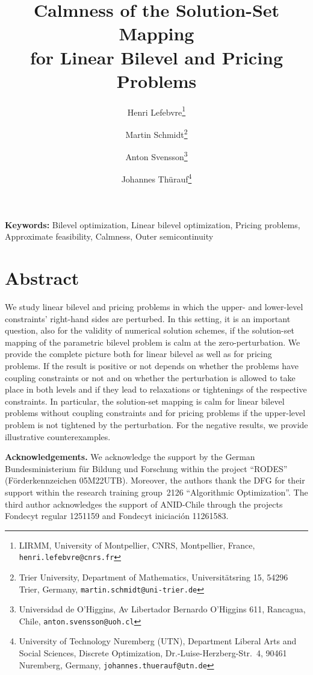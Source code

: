 \documentclass[11pt]{article}
\title{\bfseries Calmness of the Solution-Set Mapping\\for Linear
  Bilevel and Pricing Problems}
\author{
  Henri Lefebvre\thanks{LIRMM, University of Montpellier, CNRS,
    Montpellier, France,
    \texttt{henri.lefebvre@cnrs.fr}}
  \and
  Martin Schmidt\thanks{Trier University,
    Department of Mathematics,
    Universitätsring 15,
    54296 Trier,
    Germany,
    \texttt{martin.schmidt@uni-trier.de}}
  \and
  Anton Svensson\thanks{Universidad de O'Higgins, Av Libertador Bernardo O'Higgins 611,
    Rancagua,
    Chile,
    \texttt{anton.svensson@uoh.cl}}
  \and
  Johannes Thürauf\thanks{University of Technology Nuremberg (UTN),
    Department Liberal Arts and Social Sciences,
    Discrete Optimization,
    Dr.-Luise-Herzberg-Str.\ 4,
    90461 Nuremberg,
    Germany,
    \texttt{johannes.thuerauf@utn.de}}
}
\date{}
\begin{document}
\maketitle

\vspace{-1em}

\noindent
\textbf{Keywords:}
Bilevel optimization,
Linear bilevel optimization,
Pricing problems,
Approximate feasibility,
Calmness,
Outer semicontinuity

\vspace{0.5em}


\vspace{1em}

\section*{Abstract}

We study linear bilevel and pricing problems in which the upper- and
lower-level constraints' right-hand sides are perturbed.
In this setting, it is an important question, also for the validity of
numerical solution schemes, if the solution-set mapping of the
parametric bilevel problem is calm at the zero-perturbation.
We provide the complete picture both for linear bilevel as well as for
pricing problems.
If the result is positive or not depends on whether the problems have
coupling constraints or not and on whether the perturbation is allowed
to take place in both levels and if they lead to relaxations or
tightenings of the respective constraints.
In particular, the solution-set mapping is calm for linear bilevel
problems without coupling constraints and for pricing problems if the
upper-level problem is not tightened by the perturbation.
For the negative results, we provide illustrative counterexamples.

\vspace{1em}

\noindent
\textbf{Acknowledgements.}
We acknowledge the support by the German
Bundesministerium f\"ur Bildung und Forschung within
the project ``RODES'' (F\"orderkennzeichen 05M22UTB).
Moreover, the authors thank the DFG for their support within
the research training group~2126 ``Algorithmic Optimization''.
The third author acknowledges the support of ANID-Chile through the
projects Fondecyt regular 1251159 and Fondecyt iniciación 11261583.

\vspace{1em}

%
%
%
\end{document}
